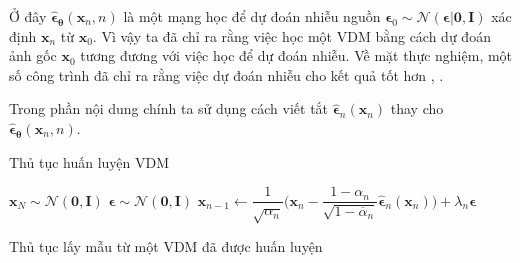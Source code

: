\documentclass[14pt, a4paper]{article}
\numberwithin{equation}{section}
\numberwithin{figure}{section}
\numberwithin{dl}{section}
\numberwithin{md}{section}
\numberwithin{bd}{section}
\numberwithin{dn}{section}
\numberwithin{hq}{section}
\begin{document}
    Ở đây $\hat{\boldsymbol{\epsilon}}_{\boldsymbol{\theta}} (\boldsymbol{x}_n, n)$ là một mạng học để dự đoán nhiễu nguồn $\boldsymbol{\epsilon}_0 \sim \mathcal{N} (\boldsymbol{\epsilon} \vert \boldsymbol{0}, \boldsymbol{I})$ xác định $\boldsymbol{x}_n$ từ $\boldsymbol{x}_0$.
    Vì vậy ta đã chỉ ra rằng việc học một VDM bằng cách dự đoán ảnh gốc $\boldsymbol{x}_0$ tương đương với việc học để dự đoán nhiễu.
    Về mặt thực nghiệm, một số công trình đã chỉ ra rằng việc dự đoán nhiễu cho kết quả tốt hơn \cite{ho2020denoising}, \cite{saharia2022photorealistic}.

    Trong phần nội dung chính ta sử dụng cách viết tắt $\hat{\boldsymbol{\epsilon}}_n (\boldsymbol{x}_n)$ thay cho $\hat{\boldsymbol{\epsilon}}_{\boldsymbol{\theta}} (\boldsymbol{x}_n, n)$.

    \begin{algorithm}[h!]
        \DontPrintSemicolon
        \caption{Thủ tục huấn luyện VDM}
        \label{alg:Learning-of-VDM}
    \end{algorithm}

    \begin{algorithm}[h!]
        \DontPrintSemicolon
        $\boldsymbol{x}_N \sim \mathcal{N} (\boldsymbol{0}, \boldsymbol{I})$\;
         {
             {
                $\boldsymbol{\epsilon} \sim \mathcal{N}(\boldsymbol{0}, \boldsymbol{I})$\;
            } 
        $\boldsymbol{x}_{n-1} \gets \dfrac{1}{\sqrt{\alpha_n}} \Big( \boldsymbol{x}_n - \dfrac{1 - \alpha_n}{\sqrt{1 - \overline{\alpha}_n}} \hat{\boldsymbol{\epsilon}}_n (\boldsymbol{x}_n) \Big) + \lambda_n \boldsymbol{\epsilon}$\;
        }
        \;
        \caption{Thủ tục lấy mẫu từ một VDM đã được huấn luyện}
        \label{alg:Sampling-of-VDM}
    \end{algorithm}
\end{document}
